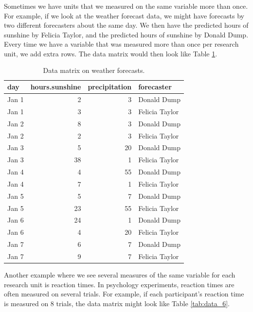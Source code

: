 \documentclass[]{report}\usepackage[]{graphicx}\usepackage[]{color}
\begin{document}
Sometimes we have units that we measured on the same variable more than once. For example, if we look at the weather forecast data, we might have forecasts by two different forecasters about the same day. We then have the predicted hours of sunshine by Felicia Taylor, and the predicted hours of sunshine by Donald Dump. Every time we have a variable that was measured more than once per research unit, we add extra rows. The data matrix would then look like Table \ref{tab:data_5}.


\begin{table}[ht]
\centering
\caption{Data matrix on weather forecasts.} 
\label{tab:data_5}
\begin{tabular}{lrrl}
  \hline
day & hours.sunshine & precipitation & forecaster \\ 
  \hline
Jan 1 & 2 & 3 & Donald Dump \\ 
  Jan 1 & 3 & 3 & Felicia Taylor \\ 
  Jan 2 & 8 & 3 & Donald Dump \\ 
  Jan 2 & 2 & 3 & Felicia Taylor \\ 
  Jan 3 & 5 & 20 & Donald Dump \\ 
  Jan 3 & 38 & 1 & Felicia Taylor \\ 
  Jan 4 & 4 & 55 & Donald Dump \\ 
  Jan 4 & 7 & 1 & Felicia Taylor \\ 
  Jan 5 & 5 & 7 & Donald Dump \\ 
  Jan 5 & 23 & 55 & Felicia Taylor \\ 
  Jan 6 & 24 & 1 & Donald Dump \\ 
  Jan 6 & 4 & 20 & Felicia Taylor \\ 
  Jan 7 & 6 & 7 & Donald Dump \\ 
  Jan 7 & 9 & 7 & Felicia Taylor \\ 
   \hline
\end{tabular}
\end{table}


Another example where we see several measures of the same variable for each research unit is reaction times. In psychology experiments, reaction times are often measured on several trials. For example, if each participant's reaction time is measured on 8 trials, the data matrix might look like Table \ref{tab:data_6}.
\end{document}
